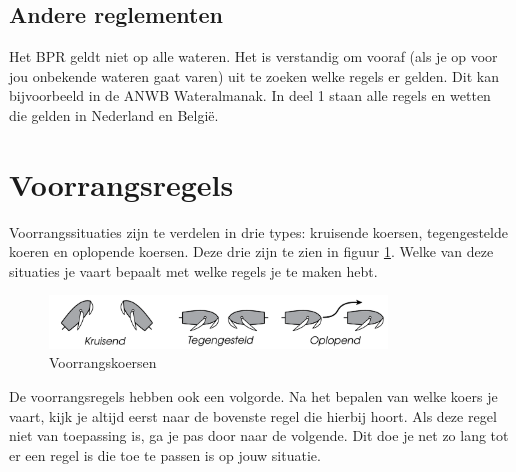 \subsection{Andere reglementen}
Het BPR geldt niet op alle wateren. Het is verstandig om vooraf (als je op voor jou onbekende wateren gaat varen) uit te zoeken welke regels er gelden. Dit kan bijvoorbeeld in de ANWB Wateralmanak. In deel 1 staan alle regels en wetten die gelden in Nederland en België. 

\newpage
\section{Voorrangsregels}
Voorrangssituaties zijn te verdelen in drie types: kruisende koersen, tegengestelde koeren en oplopende koersen. Deze drie zijn te zien in figuur \ref{pic:voorrangkoers}. Welke van deze situaties je vaart bepaalt met welke regels je te maken hebt. 
\begin{figure}[H]
    \centering
    \includegraphics[width=0.8\textwidth]{Hoofdstukken/Reglementen/pdf/voorrangskoersen.pdf}
    \caption{Voorrangskoersen}
    \centering
    \label{pic:voorrangkoers}
\end{figure}
De voorrangsregels hebben ook een volgorde. Na het bepalen van welke koers je vaart, kijk je altijd eerst naar de bovenste regel die hierbij hoort. Als deze regel niet van toepassing is, ga je pas door naar de volgende. Dit doe je net zo lang tot er een regel is die toe te passen is op jouw situatie.



